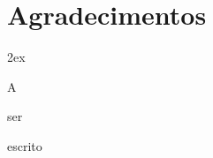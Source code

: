 %
%


\chapter*{Agradecimentos}
\thispagestyle{empty}

\begin{trivlist}  \itemsep 2ex

\item A 
\item ser
\item escrito

\end{trivlist}






